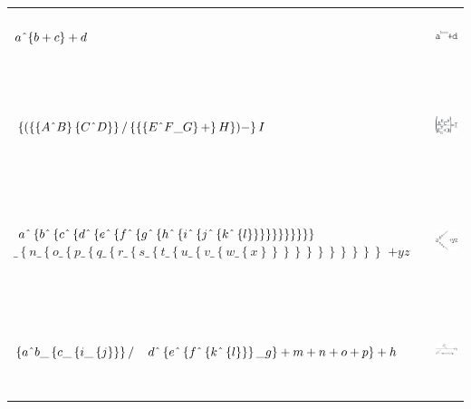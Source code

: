 \documentclass[a4paper, 10pt, twoside]{article}
\begin{document}
\begin{adjustwidth}{-4em}{}
\begin{tabular}{>{\centering\arraybackslash}m{3in} c}
\huge\( a \string^ \{b + c\} + d \) \vfill & \includegraphics[height=4em]{images/simple.png} \\
\\
\large\( \left\{(\left\{\left\{A \string^ B\right\}\left\{C \string^ D\right\}\right\}/\left\{\left\{\left\{E \string^ F \_ G\right\}+\right\}H\right\})-\right\}I \) \vfill  & \includegraphics[height=8em]{images/catedra.png} \\
\\
\large\( a \string^ \left\{b \string^ \left\{c \string^ \left\{d \string^ \left\{e \string^ \left\{f \string^ \left\{g \string^ \left\{h \string^ \left\{i \string^ \left\{j \string^ \left\{k \string^ \left\{l\right\}\right\}\right\}\right\}\right\}\right\}\right\}\right\}\right\}\right\}\right\} \) \large\(\_ \left\{n \_ \left\{o \_ \left\{p \_ \left\{q \_ \left\{r \_ \left\{s \_ \left\{t \_ \left\{u \_ \left\{v \_ \left\{w \_ \left\{x\right\}\right\}\right\}\right\}\right\}\right\}\right\}\right\}\right\}\right\}\right\} \) \large\( +yz \) \vfill & \includegraphics[height=8em]{images/doublemountain.png} \\
\\
\large \( \left\{a \string^ b \_ \left\{c \_ \left\{i \_ \left\{j\right\}\right\}\right\} / \right. \) \( \left. d \string^ \left\{e \string^ \left\{f \string^ \left\{k \string^ \left\{l\right\}\right\}\right\} \_ g\right\} +m+n+o+p \right\}+h \) \vfill & \includegraphics[height=7em]{images/division.png} \\


\end{tabular}
\end{adjustwidth}
\end{document}

